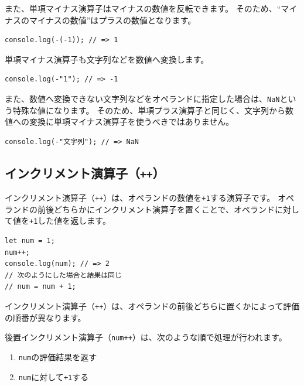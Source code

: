 また、単項マイナス演算子はマイナスの数値を反転できます。
そのため、``マイナスのマイナスの数値''はプラスの数値となります。

\begin{lstlisting}
console.log(-(-1)); // => 1
\end{lstlisting}

単項マイナス演算子も文字列などを数値へ変換します。

\begin{lstlisting}
console.log(-"1"); // => -1
\end{lstlisting}

\enlargethispage{\baselineskip}また、数値へ変換できない文字列などをオペランドに指定した場合は、\texttt{NaN}という特殊な値になります。
そのため、単項プラス演算子と同じく、文字列から数値への変換に単項マイナス演算子を使うべきではありません。

\begin{lstlisting}
console.log(-"文字列"); // => NaN
\end{lstlisting}

\hypertarget{increment-operator}{%
\subsection{\texorpdfstring{インクリメント演算子（\texttt{++}）}{インクリメント演算子（++）}}\label{increment-operator}}

インクリメント演算子（\texttt{++}）は、オペランドの数値を\texttt{+1}する演算子です。
オペランドの前後どちらかにインクリメント演算子を置くことで、オペランドに対して値を\texttt{+1}した値を返します。

\begin{lstlisting}
let num = 1;
num++;
console.log(num); // => 2
// 次のようにした場合と結果は同じ
// num = num + 1;
\end{lstlisting}

インクリメント演算子（\texttt{++}）は、オペランドの前後どちらに置くかによって評価の順番が異なります。

後置インクリメント演算子（\texttt{num++}）は、次のような順で処理が行われます。

\begin{enumerate}
\def\labelenumi{\arabic{enumi}.}
\item
  \texttt{num}の評価結果を返す
\item
  \texttt{num}に対して\texttt{+1}する
\end{enumerate}

